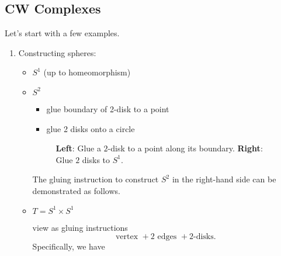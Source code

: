 \subsection{CW Complexes}
\begin{eg}
	Let's start with a few examples.
	\begin{enumerate}
		\item Constructing spheres:
		      \begin{itemize}
			      \item \(S^1\) (up to homeomorphism)
			            \begin{figure}[H]
				            \centering
				            \label{fig:eg:constructing-sphere-1}
			            \end{figure}
			      \item \(S^2\)
			            \begin{itemize}
				            \item glue boundary of 2-disk to a point
				            \item glue 2 disks onto a circle
			            \end{itemize}
			            \begin{figure}[H]
				            \centering
				            \caption{\textbf{Left}: Glue a \(2\)-disk to a point along its boundary. \textbf{Right}: Glue \(2\) disks to \(S^1\).}
				            \label{fig:eg:constructing-sphere-2}
			            \end{figure}
			            The gluing instruction to construct \(S^2\) in the right-hand side can be demonstrated as follows.
			            \begin{figure}[H]
				            \centering
				            \label{fig:eg:constructing-sphere-2-gluing-instr}
			            \end{figure}
			      \item \(T = S^1 \times S^1\)
			            \begin{figure}[H]
				            \centering
				            \label{fig:eg:constructing-torus}
			            \end{figure}
			            view as gluing instructions
			            \[
				            \text{vertex }+ 2 \text{ edges }+2\text{-disks}.
			            \]
			            Specifically, we have
			            \begin{figure}[H]
				            \centering
				            \label{fig:eg:constructing-torus-gluing-instr}
			            \end{figure}
		      \end{itemize}
	\end{enumerate}
\end{eg}

